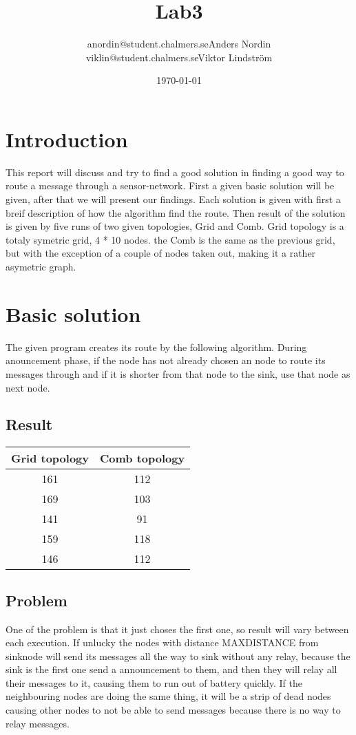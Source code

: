 \documentclass{article}
\title{Lab3}
\author{anordin@student.chalmers.se\quad Anders Nordin\\
        viklin@student.chalmers.se\quad Viktor Lindstr\"{o}m}
\date{\today}
\begin{document}
\maketitle
\newpage

\section{Introduction}
  This report will discuss and try to find a good solution in finding a 
  good way to route a message through a sensor-network.
  First a given basic solution will be given, after that
  we will present our findings. Each solution is given with first
  a breif description of how the algorithm find the route. Then 
  result of the solution is given by five runs of two given topologies,
  Grid and Comb. Grid topology is a totaly symetric grid, 4 * 10 nodes.
  the Comb is the same as the previous grid, but with the exception of
  a couple of nodes taken out, making it a rather asymetric graph.
\section{Basic solution}
  The given program creates its route by the following algorithm.
  During anouncement phase, if the node has not already chosen an 
  node to route its messages through and if it is shorter
  from that node to the sink, use that node as next node.
  \subsection{Result}
    \begin{tabular}{c|c}
      Grid topology & Comb topology\\
      \hline
      \hline
      161 & 112\\
      169 & 103\\
      141 & 91\\
      159 & 118\\
      146 & 112\\
    \end{tabular}

  \subsection{Problem}
    One of the problem is that it just choses the first one,
    so result will vary between each execution.
    If unlucky the nodes with distance MAXDISTANCE from
    sinknode will send its messages all the way to sink
    without any relay, because the sink is the first one
    send a announcement to them, and then they will relay
    all their messages to it, causing them to run out of 
    battery quickly. If the neighbouring nodes
    are doing the same thing, it will be a strip of dead
    nodes causing other nodes to not be able to send messages
    because there is no way to relay messages. 
\end{document}
